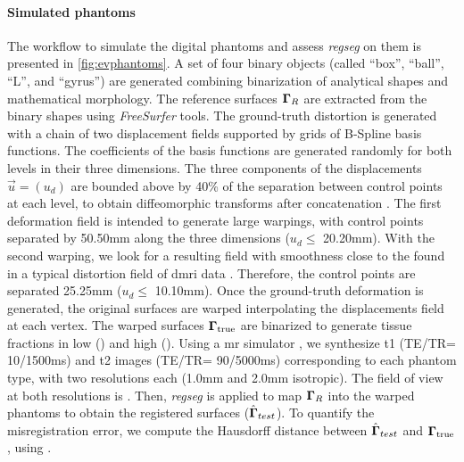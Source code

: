\paragraph*{Simulated phantoms}\label{sec:digital_phantoms}
The workflow to simulate the digital phantoms and assess
  \emph{regseg} on them is presented in \autoref{fig:evphantoms}.
A set of four binary objects (called ``box'', ``ball'', ``L'',
  and ``gyrus'') are generated combining binarization of
  analytical shapes and mathematical morphology.
The reference surfaces $\boldsymbol{\Gamma}_R$ are extracted from the binary shapes
  using \emph{FreeSurfer} tools.
The ground-truth distortion is generated with a chain of two displacement 
  fields supported by grids of B-Spline basis functions.
The coefficients of the basis functions are generated randomly for
  both levels in their three dimensions.
The three components of the displacements $\vec{u} = (u_d)$ 
  are bounded above by 40\% of the separation between control points
  at each level, to obtain diffeomorphic transforms
  after concatenation \citep{rueckert_diffeomorphic_2006}.
The first deformation field is intended to generate large warpings,
  with control points separated by 50.50mm along the three dimensions
  ($u_d\leq$ 20.20mm).
With the second warping, we look for a resulting field with smoothness
  close to the found in a typical distortion field of \gls*{dmri} data
  \citep{irfanoglu_susceptibility_2011}.
Therefore, the control points are separated 25.25mm ($u_d\leq$ 10.10mm).
Once the ground-truth deformation is generated, the original surfaces
  are warped interpolating the displacements field at each vertex.
The warped surfaces $\boldsymbol{\Gamma}_\text{true}$ are binarized to generate tissue fractions
  in low () and high ().
Using a \gls*{mr} simulator \citep{caruyer_phantomas_2014}, we synthesize
  \gls*{t1} (TE/TR= 10/1500ms) and \gls*{t2} images (TE/TR= 90/5000ms)
  corresponding to each phantom type, with two resolutions each
  (1.0mm and 2.0mm isotropic).
The field of view at both resolutions is .
Then, \emph{regseg} is applied to map $\boldsymbol{\Gamma}_R$ into the warped phantoms to
  obtain the registered surfaces ($\hat{\boldsymbol{\Gamma}}_{test}$).
To quantify the misregistration error, we compute the Hausdorff distance between
 $\hat{\boldsymbol{\Gamma}}_{test}$ and $\boldsymbol{\Gamma}_\text{true}$, using \citep{commandeur_vtk_2011}.

